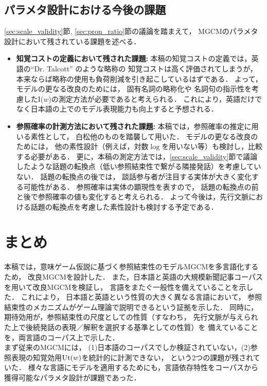 \documentclass[japanese]{jnlp_1.3e}
\begin{document}
\subsection{パラメタ設計における今後の課題}
\ref{sec:scale_validity}節, \ref{sec:pron_ratio}節の議論を踏まえて，
MGCMのパラメタ設計において残されている課題を述べる．
\begin{itemize}
\item {\bf 知覚コストの定義において残された課題: } 
本稿の知覚コストの定義では，英語の``Dr. Talcott'' のような略称の
知覚コストは高く評価されてしまうが，
本来ならば略称の使用も負荷削減を引き起こしているはずである．
よって，モデルの更なる改良のためには，
固有名詞の略称化や
名詞句の指示性を考慮したI($w$)の測定方法が必要であると考えられる．
これにより，英語だけでなく日本語の上でのモデル表現能力も向上すると予想される．
\item {\bf 参照確率の計測方法において残された課題: }
本稿では，参照確率の推定に用いる素性として，
白松他\citeyear{siramatu2005nlp}のものを踏襲して用いた．
モデルの更なる改良のためには，
他の素性設計（例えば，対数$\log$を用いない等）も検討し，比較する必要がある．
更に，本稿の測定方法では，\ref{sec:scale_validity}節で議論したような話題の転換点（低い参照結束性で繋がる隣接発話）を考慮していない．
話題の転換点の後では，
談話参与者が注目する実体が大きく変化する可能性がある．
参照確率は実体の顕現性を表すので，
話題の転換点の前と後で参照確率の値も変化すると考えられる．
よって今後は，先行文脈における話題の転換点を考慮した素性設計も検討する予定である．
\end{itemize}



\section{まとめ}
\label{sec:conc}

本稿では，意味ゲーム仮説に基づく参照結束性のモデルMGCMを多言語化するため，
改良MGCMを設計した．
また，日本語と英語の大規模新聞記事コーパスを用いて改良MGCMを検証し，
言語をまたぐ一般性を備えていることを示した．
これにより，
日本語と英語という性質の大きく異なる言語において，
参照結束性のメカニズムがゲーム理論で説明できるという証拠を示した．
同時に，期待効用が，参照結束性の尺度としての性質（すなわち，
先行文脈が与えられた上で後続発話の表現／解釈を選択する基準としての性質）を
備えていることを，両言語のコーパス上で示した．
\\



まず従来のMGCMには，
(1)日本語のコーパスでしか検証されていない，(2)参照表現の知覚効用${\rm Ut}(w)$を統計的に計測できない，
という2つの課題が残されていた．
様々な言語にモデルを適用するためにも，言語依存特性をコーパスから獲得可能なパラメタ設計が課題であった．
\end{document}
